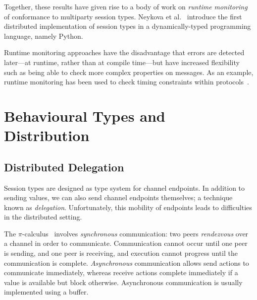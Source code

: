 \documentclass[
graybox,
envcountchap
]{svmult}
\begin{document}
\begin{bibunit}
  Together, these results have given rise to a body of work on \emph{runtime
  monitoring} of conformance to multiparty session types. Neykova et
  al.~\cite{NeykovaYH13:spy} introduce the first distributed implementation of
  session types in a dynamically-typed programming language, namely Python.

  Runtime monitoring approaches have the disadvantage that errors are detected
  later---at runtime, rather than at compile time---but have increased
  flexibility such as being able to check more complex properties on messages.
  As an example, runtime monitoring has been used to check timing
  constraints within protocols~\cite{NeykovaBY17:timed-monitoring}.


  \section{Behavioural Types and Distribution}\label{sec:bt:distrib}

  \subsection{Distributed Delegation}\label{sec:bt:distrib-deleg}
  Session types are designed as type system for channel endpoints.
  In addition to sending values, we can also send channel endpoints themselves;
  a technique known as \emph{delegation}. Unfortunately, this mobility of
  endpoints leads to difficulties in the distributed setting.

  The $\pi$-calculus~\cite{Milner99:pi-calc} involves \emph{synchronous}
  communication: two peers \emph{rendezvous} over a channel in order to
  communicate. Communication cannot occur until one peer is sending, and one
  peer is receiving, and execution cannot progress until the communication is
  complete. \emph{Asynchronous} communication allows send actions to communicate
  immediately, whereas receive actions complete immediately if a value is
  available but block otherwise.  Asynchronous communication is usually
  implemented using a buffer.



\end{bibunit}
\end{document}
